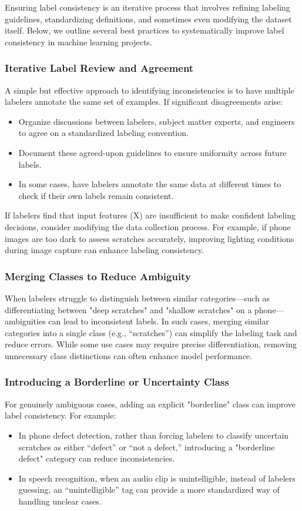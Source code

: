 \documentclass[12pt,openany]{book}
\begin{document}
Ensuring label consistency is an iterative process that involves refining labeling guidelines, standardizing definitions, and sometimes even modifying the dataset itself. Below, we outline several best practices to systematically improve label consistency in machine learning projects.

\subsubsection{Iterative Label Review and Agreement}
A simple but effective approach to identifying inconsistencies is to have multiple labelers annotate the same set of examples. If significant disagreements arise:
\begin{itemize}
    \item Organize discussions between labelers, subject matter experts, and engineers to agree on a standardized labeling convention.
    \item Document these agreed-upon guidelines to ensure uniformity across future labels.
    \item In some cases, have labelers annotate the same data at different times to check if their own labels remain consistent.
\end{itemize}

If labelers find that input features (X) are insufficient to make confident labeling decisions, consider modifying the data collection process. For example, if phone images are too dark to assess scratches accurately, improving lighting conditions during image capture can enhance labeling consistency.

\subsubsection{Merging Classes to Reduce Ambiguity}
When labelers struggle to distinguish between similar categories—such as differentiating between "deep scratches" and "shallow scratches" on a phone—ambiguities can lead to inconsistent labels. In such cases, merging similar categories into a single class (e.g., “scratches”) can simplify the labeling task and reduce errors. While some use cases may require precise differentiation, removing unnecessary class distinctions can often enhance model performance.

\subsubsection{Introducing a Borderline or Uncertainty Class}
For genuinely ambiguous cases, adding an explicit "borderline" class can improve label consistency. For example:
\begin{itemize}
    \item In phone defect detection, rather than forcing labelers to classify uncertain scratches as either “defect” or “not a defect,” introducing a "borderline defect" category can reduce inconsistencies.
    \item In speech recognition, when an audio clip is unintelligible, instead of labelers guessing, an “unintelligible” tag can provide a more standardized way of handling unclear cases.
\end{itemize}
\end{document}
